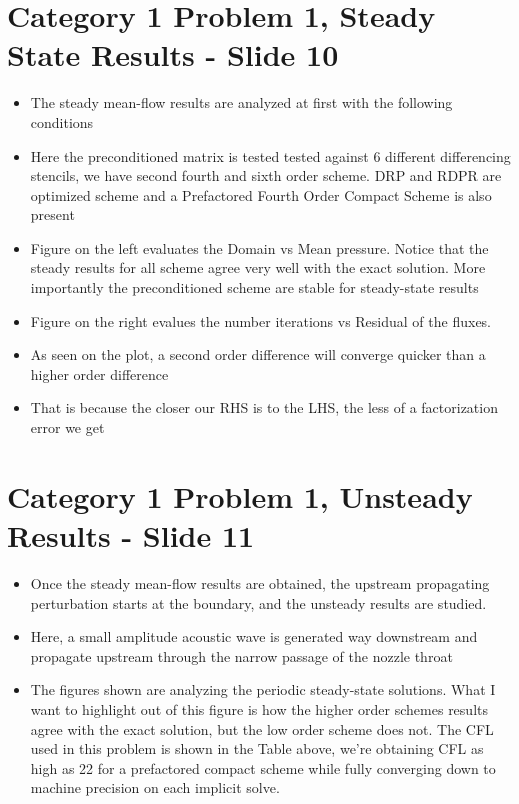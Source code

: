 \documentclass[a4paper,17pt]{extarticle}
\begin{document}
\pagebreak \section*{Category 1 Problem 1, Steady State Results - Slide 10}
\begin{itemize}
   \item The steady mean-flow results are analyzed at first with the following conditions
   \item Here the preconditioned matrix is tested tested against 6 different differencing stencils,
      we have second fourth and sixth order scheme. DRP and RDPR are optimized scheme and a
      Prefactored Fourth Order Compact Scheme is also present
   \item Figure on the left evaluates the Domain vs Mean pressure. Notice that the steady results
      for all scheme agree very well with the exact solution. More importantly the preconditioned
      scheme are stable for steady-state results
   \item Figure on the right evalues the number iterations vs Residual of the fluxes. 
   \item As seen on the plot, a second order difference will converge quicker than a higher order 
         difference
   \item That is because the closer our RHS is to the LHS, the less of a factorization error we get
\end{itemize}

\pagebreak \section*{Category 1 Problem 1, Unsteady Results - Slide 11}
\begin{itemize}
   \item Once the steady mean-flow results are obtained, the upstream propagating perturbation
         starts at the boundary, and the unsteady results are studied.
   \item Here, a small amplitude acoustic wave is generated way downstream and propagate upstream
      through the narrow passage of the nozzle throat
   \item The figures shown are analyzing the periodic steady-state solutions. What I want to
         highlight out of this figure is how the higher order schemes results agree with the exact
         solution, but the low order scheme does not. The CFL used in this problem is shown in the
         Table above, we're obtaining CFL as high as 22 for a prefactored compact scheme while fully
         converging down to machine precision on each implicit solve. 
\end{itemize}
\end{document}
